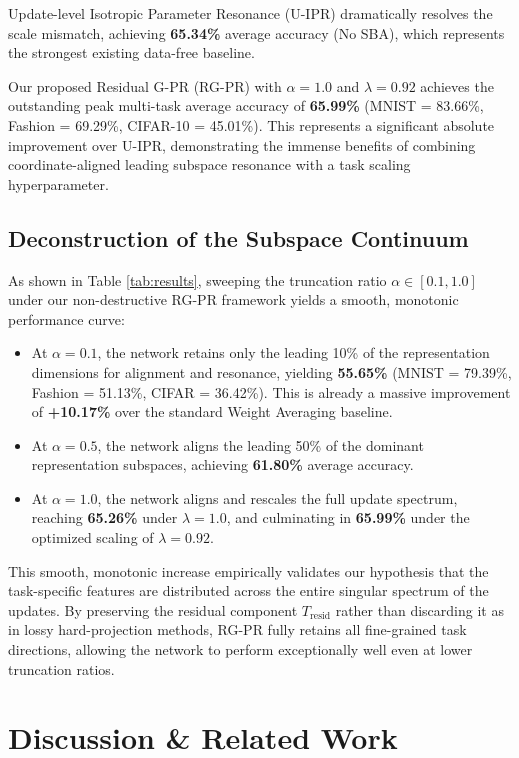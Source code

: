 \documentclass{article}
\theoremstyle{plain}
\theoremstyle{definition}
\theoremstyle{remark}
\begin{document}
Update-level Isotropic Parameter Resonance (U-IPR) dramatically resolves the scale mismatch, achieving \textbf{65.34\%} average accuracy (No SBA), which represents the strongest existing data-free baseline.

Our proposed Residual G-PR (RG-PR) with $\alpha = 1.0$ and $\lambda = 0.92$ achieves the outstanding peak multi-task average accuracy of \textbf{65.99\%} (MNIST = 83.66\%, Fashion = 69.29\%, CIFAR-10 = 45.01\%). This represents a significant absolute improvement over U-IPR, demonstrating the immense benefits of combining coordinate-aligned leading subspace resonance with a task scaling hyperparameter.

\subsection{Deconstruction of the Subspace Continuum}
As shown in Table \ref{tab:results}, sweeping the truncation ratio $\alpha \in [0.1, 1.0]$ under our non-destructive RG-PR framework yields a smooth, monotonic performance curve:
\begin{itemize}
    \item At $\alpha = 0.1$, the network retains only the leading 10\% of the representation dimensions for alignment and resonance, yielding \textbf{55.65\%} (MNIST = 79.39\%, Fashion = 51.13\%, CIFAR = 36.42\%). This is already a massive improvement of \textbf{+10.17\%} over the standard Weight Averaging baseline.
    \item At $\alpha = 0.5$, the network aligns the leading 50\% of the dominant representation subspaces, achieving \textbf{61.80\%} average accuracy.
    \item At $\alpha = 1.0$, the network aligns and rescales the full update spectrum, reaching \textbf{65.26\%} under $\lambda = 1.0$, and culminating in \textbf{65.99\%} under the optimized scaling of $\lambda = 0.92$.
\end{itemize}

This smooth, monotonic increase empirically validates our hypothesis that the task-specific features are distributed across the entire singular spectrum of the updates. By preserving the residual component $T_{\text{resid}}$ rather than discarding it as in lossy hard-projection methods, RG-PR fully retains all fine-grained task directions, allowing the network to perform exceptionally well even at lower truncation ratios.

\section{Discussion \& Related Work}
\label{sec:related}
\end{document}
